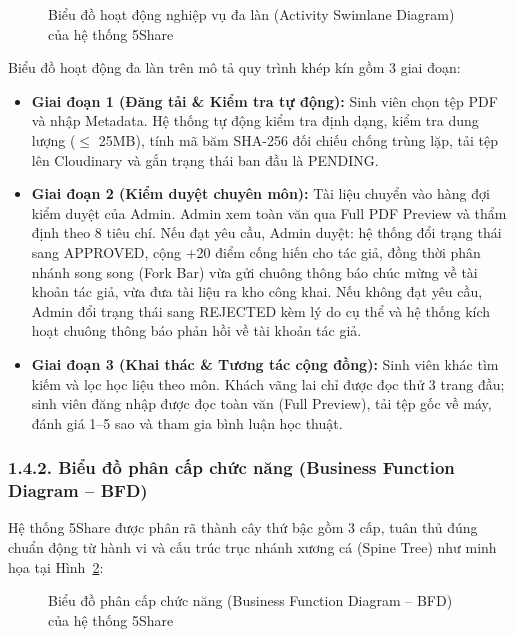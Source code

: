 \begin{figure}[htbp]
\centering
\caption{Biểu đồ hoạt động nghiệp vụ đa làn (Activity Swimlane Diagram) của hệ thống 5Share}
\label{fig:swimlane}
\end{figure}

Biểu đồ hoạt động đa làn trên mô tả quy trình khép kín gồm 3 giai đoạn:
\begin{itemize}
    \item \textbf{Giai đoạn 1 (Đăng tải \& Kiểm tra tự động):} Sinh viên chọn tệp PDF và nhập Metadata. Hệ thống tự động kiểm tra định dạng, kiểm tra dung lượng ($\le$ 25MB), tính mã băm SHA-256 đối chiếu chống trùng lặp, tải tệp lên Cloudinary và gắn trạng thái ban đầu là PENDING.
    \item \textbf{Giai đoạn 2 (Kiểm duyệt chuyên môn):} Tài liệu chuyển vào hàng đợi kiểm duyệt của Admin. Admin xem toàn văn qua Full PDF Preview và thẩm định theo 8 tiêu chí. Nếu đạt yêu cầu, Admin duyệt: hệ thống đổi trạng thái sang APPROVED, cộng +20 điểm cống hiến cho tác giả, đồng thời phân nhánh song song (Fork Bar) vừa gửi chuông thông báo chúc mừng về tài khoản tác giả, vừa đưa tài liệu ra kho công khai. Nếu không đạt yêu cầu, Admin đổi trạng thái sang REJECTED kèm lý do cụ thể và hệ thống kích hoạt chuông thông báo phản hồi về tài khoản tác giả.
    \item \textbf{Giai đoạn 3 (Khai thác \& Tương tác cộng đồng):} Sinh viên khác tìm kiếm và lọc học liệu theo môn. Khách vãng lai chỉ được đọc thử 3 trang đầu; sinh viên đăng nhập được đọc toàn văn (Full Preview), tải tệp gốc về máy, đánh giá 1--5 sao và tham gia bình luận học thuật.
\end{itemize}

\subsubsection{1.4.2. Biểu đồ phân cấp chức năng (Business Function Diagram -- BFD)}
Hệ thống 5Share được phân rã thành cây thứ bậc gồm 3 cấp, tuân thủ đúng chuẩn động từ hành vi và cấu trúc trục nhánh xương cá (Spine Tree) như minh họa tại Hình~\ref{fig:bfd}:

\begin{figure}[htbp]
\centering
\caption{Biểu đồ phân cấp chức năng (Business Function Diagram -- BFD) của hệ thống 5Share}
\label{fig:bfd}
\end{figure}

